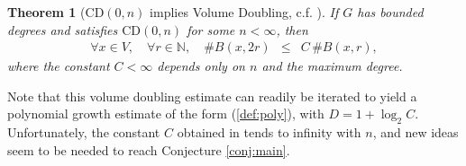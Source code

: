 \documentclass[12pt,final]{article}
\newtheorem{theorem}{Theorem}
\newcommand{\dN}{\mathbb {N}}
\newcommand{\CD}{\mathrm{CD}}
\begin{document}
\begin{theorem}[$\CD(0,n)$ implies Volume Doubling, c.f. \cite{münch2019,russ2025}]\label{th:dim} If $G$ has bounded degrees and satisfies $\CD(0,n)$ for some $n<\infty$, then 
\begin{eqnarray}
\label{def:VD}
\forall x\in V,\quad \forall r\in\dN,\quad \# B(x,2r) & \le & C\, \# B(x,r),
\end{eqnarray}
where the constant $C<\infty$ depends only on $n$ and the maximum degree. 
\end{theorem}
Note that this volume doubling estimate can readily be iterated to yield a polynomial growth estimate of the form (\ref{def:poly}), with $D=1+\log_2 C$. Unfortunately, the constant $C$ obtained in \cite{münch2019,russ2025} tends to infinity with $n$, and new ideas seem to be needed to reach Conjecture \ref{conj:main}. 
\end{document}
